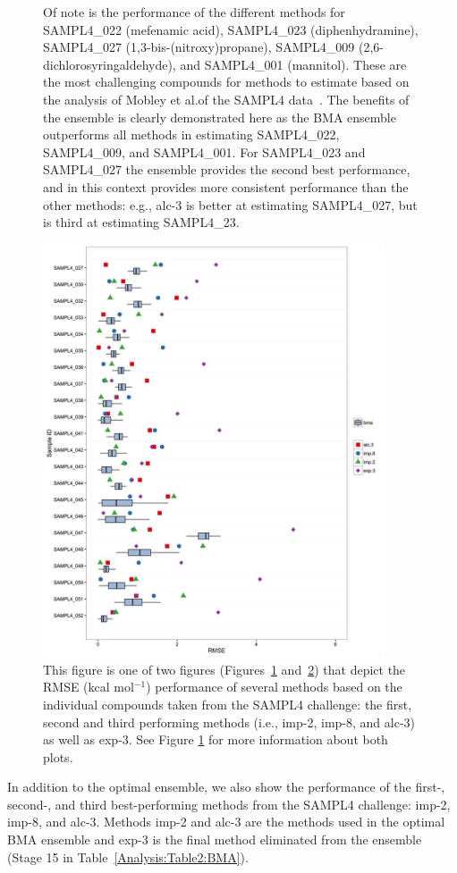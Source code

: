 \documentclass[journal=jpcbfk, manuscript=article]{achemso}
\newcommand{\+}[1]{\ensuremath{\mathbf{#1}}}
\begin{document}
\begin{figure}
{	Of note is the performance of the different methods for SAMPL4\_022 (mefenamic acid), SAMPL4\_023 (diphenhydramine), SAMPL4\_027 (1,3-bis-(nitroxy)propane), SAMPL4\_009 (2,6-dichlorosyringaldehyde), and SAMPL4\_001 (mannitol).
	These are the most challenging compounds for methods to estimate based on the analysis of Mobley et al.\@ of the SAMPL4 data~\cite{Mobley:2014}.
	The benefits of the ensemble is clearly demonstrated here as the BMA ensemble outperforms all methods in estimating SAMPL4\_022, SAMPL4\_009, and SAMPL4\_001.
	For SAMPL4\_023 and SAMPL4\_027 the ensemble provides the second best performance, and in this context provides more consistent performance than the other methods: e.g., alc-3 is better at estimating SAMPL4\_027, but is third at estimating SAMPL4\_23.}
\label{Analysis:Figure4:Compounds1}
\end{figure}
\begin{figure}
	\centering
	\includegraphics[keepaspectratio,width=0.9\textwidth]{Figures/compounds_2}
	\caption{This figure is one of two figures (Figures~\ref{Analysis:Figure4:Compounds1} and~\ref{Analysis:Figure5:Compounds2}) that depict the RMSE (kcal mol$^{-1}$) performance of several methods based on the individual compounds taken from the SAMPL4 challenge: the first, second and third performing methods (i.e., imp-2, imp-8, and alc-3) as well as exp-3.
	See Figure \ref{Analysis:Figure4:Compounds1} for more information about both plots.}
	\label{Analysis:Figure5:Compounds2}
\end{figure}
In addition to the optimal ensemble, we also show the performance of the first-, second-, and third best-performing methods from the SAMPL4 challenge: imp-2, imp-8, and alc-3.
Methods imp-2 and alc-3 are the methods used in the optimal BMA ensemble and exp-3 is the final method eliminated from the ensemble (Stage 15 in Table~\ref{Analysis:Table2:BMA}). 
\end{document}
